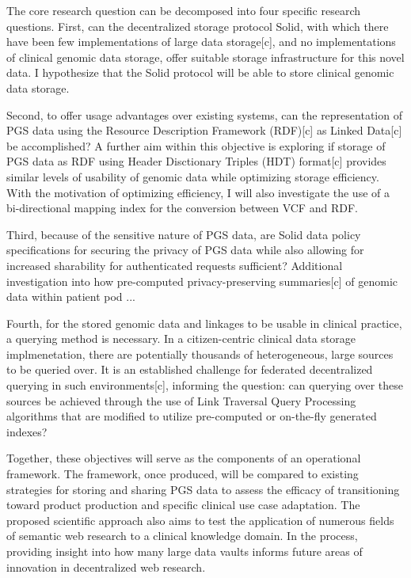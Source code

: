 \documentclass[a4paper,11pt]{article}
\begin{document}
\begin{refsection}
The core research question can be decomposed into four specific research questions.
First, can the decentralized storage protocol Solid, with which there have been few implementations of large data storage[c], and no implementations of clinical genomic data storage, offer suitable storage infrastructure for this novel data. 
I hypothesize that the Solid protocol will be able to store clinical genomic data storage.

Second, to offer usage advantages over existing systems, can the representation of PGS data using the Resource Description Framework (RDF)[c] as Linked Data[c] be accomplished? 
A further aim within this objective is exploring if storage of PGS data as RDF using Header Disctionary Triples (HDT) format[c] provides similar levels of usability of genomic data while optimizing storage efficiency.
With the motivation of optimizing efficiency, I will also investigate the use of a bi-directional mapping index for the conversion between VCF and RDF.

Third, because of the sensitive nature of PGS data, are Solid data policy specifications for securing the privacy of PGS data while also allowing for increased sharability for authenticated requests sufficient?
Additional investigation into how pre-computed privacy-preserving summaries[c] of genomic data within patient pod ...

Fourth, for the stored genomic data and linkages to be usable in clinical practice, a querying method is necessary.
In a citizen-centric clinical data storage implmenetation, there are potentially thousands of heterogeneous, large sources to be queried over.
It is an established challenge for federated decentralized querying in such environments[c], informing the question: can querying over these sources be achieved through the use of Link Traversal Query Processing algorithms that are modified to utilize pre-computed or on-the-fly generated indexes?

Together, these objectives will serve as the components of an operational framework. 
The framework, once produced, will be compared to existing strategies for storing and sharing PGS data to assess the efficacy of transitioning toward product production and specific clinical use case adaptation.
The proposed scientific approach also aims to test the application of numerous fields of semantic web research to a clinical knowledge domain. 
In the process, providing insight into how many large data vaults informs future areas of innovation in decentralized web research.


\end{refsection}
\end{document}
